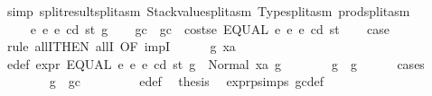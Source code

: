 \begin{isabellebody}
\ {\isacharparenleft}{\kern0pt}simp\ split{\isacharcolon}{\kern0pt}result{\isachardot}{\kern0pt}split{\isacharunderscore}{\kern0pt}asm\ Stackvalue{\isachardot}{\kern0pt}split{\isacharunderscore}{\kern0pt}asm\ Type{\isachardot}{\kern0pt}split{\isacharunderscore}{\kern0pt}asm\ prod{\isachardot}{\kern0pt}split{\isacharunderscore}{\kern0pt}asm{\isacharparenright}{\kern0pt}\isanewline
\ \ \ \ \isamarkupfalse%
\isanewline
\ \ \isamarkupfalse%
\isanewline
{}\isamarkupfalse%
\isanewline
\ \ \isamarkupfalse%
\ {\isacharparenleft}{\kern0pt}{}{}\ e{}\ e{}\ e\ cd\ st\ g{\isacharparenright}{\kern0pt}\isanewline
\ \ \isamarkupfalse%
\ gc\ \ {\isachardoublequoteopen}gc\ {\isacharequal}{\kern0pt}\ costs\isactrlsub e\ {\isacharparenleft}{\kern0pt}EQUAL\ e{}\ e{}{\isacharparenright}{\kern0pt}\ e\ cd\ st{\isachardoublequoteclose}\isanewline
\ \ \isamarkupfalse%
\ {\isacharquery}{\kern0pt}case\isanewline
\ \ \isamarkupfalse%
\ {\isacharparenleft}{\kern0pt}rule\ allI{\isacharbrackleft}{\kern0pt}THEN\ allI{\isacharcomma}{\kern0pt}\ OF\ impI{\isacharbrackright}{\kern0pt}{\isacharparenright}{\kern0pt}\isanewline
\ \ \ \ \isamarkupfalse%
\ g{}\ xa\ \isamarkupfalse%
\ e{\isacharunderscore}{\kern0pt}def{\isacharcolon}{\kern0pt}\ {\isachardoublequoteopen}expr\ {\isacharparenleft}{\kern0pt}EQUAL\ e{}\ e{}{\isacharparenright}{\kern0pt}\ e\ cd\ st\ g\ {\isacharequal}{\kern0pt}\ Normal\ {\isacharparenleft}{\kern0pt}xa{\isacharcomma}{\kern0pt}\ g{}{\isacharparenright}{\kern0pt}{\isachardoublequoteclose}\isanewline
\ \ \ \ \isamarkupfalse%
\ \isamarkupfalse%
\ {\isachardoublequoteopen}g{}\ {\isasymle}\ g{\isachardoublequoteclose}\isanewline
\ \ \ \ \isamarkupfalse%
\ {\isacharparenleft}{\kern0pt}cases{\isacharparenright}{\kern0pt}\isanewline
\ \ \ \ \ \ \isamarkupfalse%
\ {\isachardoublequoteopen}g\ {\isasymle}\ gc{\isachardoublequoteclose}\isanewline
\ \ \ \ \ \ \isamarkupfalse%
\ {}{}{\isacharparenleft}{\kern0pt}{}{\isacharparenright}{\kern0pt}\ e{\isacharunderscore}{\kern0pt}def\ \isamarkupfalse%
\ {\isacharquery}{\kern0pt}thesis\ \isamarkupfalse%
\ expr{\isachardot}{\kern0pt}psimps{\isacharparenleft}{\kern0pt}{}{}{\isacharparenright}{\kern0pt}\ gc{\isacharunderscore}{\kern0pt}def\ \isamarkupfalse%

\end{isabellebody}
